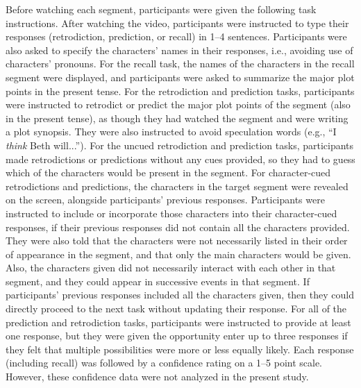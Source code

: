 \documentclass[10pt]{article}
\begin{document}
Before watching each segment, participants were given the following task instructions. After watching the video, participants were instructed to type their responses (retrodiction, prediction, or recall) in 1--4 sentences.  Participants were also asked to specify the characters' names in their responses, i.e., avoiding use of characters' pronouns. For the recall task, the names of the characters in the recall segment were displayed, and participants were asked to summarize the major plot points in the present tense. For the retrodiction and prediction tasks, participants were instructed to retrodict or predict the major plot points of the segment (also in the present tense), as though they had watched the segment and were writing a plot synopsis. They were also instructed to avoid speculation words (e.g., ``I \textit{think} Beth will...''). For the uncued retrodiction and prediction tasks, participants made retrodictions or predictions without any cues provided, so they had to guess which of the characters would be present in the segment. For character-cued retrodictions and predictions, the characters in the target segment were revealed on the screen, alongside participants’ previous responses. Participants were instructed to include or incorporate those characters into their character-cued responses, if their previous responses did not contain all the characters provided. They were also told that the characters were not necessarily listed in their order of appearance in the segment, and that only the main characters would be given. Also, the characters given did not necessarily interact with each other in that segment, and they could appear in successive events in that segment. If participants’ previous responses included all the characters given, then they could directly proceed to the next task without updating their response. For all of the prediction and retrodiction tasks, participants were instructed to provide at least one response, but they were given the opportunity enter up to three responses if they felt that multiple possibilities were more or less equally likely. Each response (including recall) was followed by a confidence rating on a 1--5 point scale. However, these confidence data were not analyzed in the present study.
\end{document}
